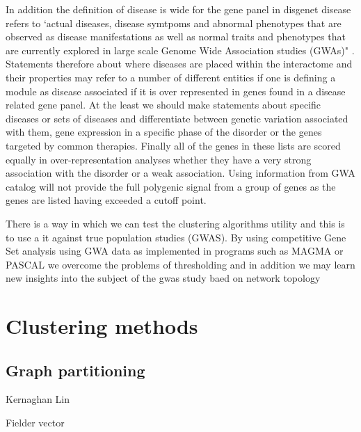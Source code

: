 In addition the definition of disease is wide for the gene panel in disgenet disease refers to `actual diseases, disease symtpoms and abnormal phenotypes that are observed as disease manifestations as well as normal traits and phenotypes that are currently explored in large scale Genome Wide Association studies (GWAs)" \cite{pinero2020disgenet}. Statements therefore about where diseases are placed within the interactome \cite{barabasi2016network}  and their properties may refer to a number of different entities if one is defining a module as disease associated if it is over represented in genes found in a disease related gene panel. At the least we should make statements about specific diseases or sets of diseases and differentiate between genetic variation associated with them, gene expression in a specific phase of the disorder or the genes targeted by common therapies. Finally all of the genes in these lists are scored equally in over-representation analyses whether they have a very strong association with the disorder or a weak association. Using information from GWA catalog will not provide the full polygenic signal from a group of genes as the genes are listed having exceeded a cutoff point. 

There is a way in which we can test the clustering algorithms utility and this is to use a it against true population studies (GWAS). By using competitive Gene Set analysis using GWA data as implemented in programs such as MAGMA \cite{de2015magma} or PASCAL \cite{lamparter2016fast} we overcome the problems of thresholding and in addition we may learn new insights into the subject of the gwas study baed on network topology 


\section{Clustering methods}

\subsection{Graph partitioning}
Kernaghan Lin

Fielder vector

